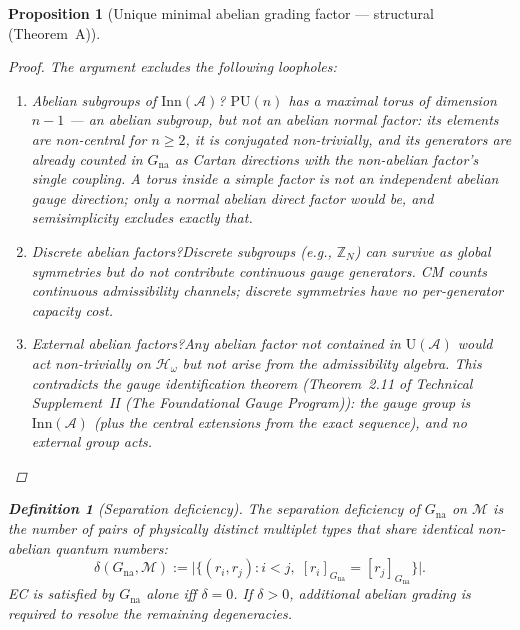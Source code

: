 \documentclass[11pt]{article}
\newtheorem{proposition}[theorem]{Proposition}
\theoremstyle{definition}
\newtheorem{definition}[theorem]{Definition}
\newcommand{\TSII}{Technical Supplement~II (\emph{The Foundational Gauge Program})}
\begin{document}
\begin{proposition}[Unique minimal abelian grading factor ---
structural (Theorem~A)]
\begin{proof}
The argument excludes the following loopholes:
\begin{enumerate}[label=(\alph*),nosep]
  \item \textit{Abelian subgroups of $\mathrm{Inn}(\mathcal{A})$?}\quad
  $\mathrm{PU}(n)$ has a maximal torus of dimension $n - 1$ --- an
  abelian subgroup, but not an abelian \emph{normal factor}: its
  elements are non-central for $n \ge 2$, it is conjugated
  non-trivially, and its generators are already counted in
  $G_{\mathrm{na}}$ as Cartan directions with the non-abelian factor's
  single coupling.  A torus inside a simple factor is not an
  independent abelian gauge direction; only a normal abelian direct
  factor would be, and semisimplicity excludes exactly that.
  \item \textit{Discrete abelian factors?}\quad Discrete subgroups
  (e.g., $\mathbb{Z}_N$) can survive as global symmetries but do not
  contribute continuous gauge generators.  CM counts continuous
  admissibility channels; discrete symmetries have no per-generator
  capacity cost.
  \item \textit{External abelian factors?}\quad Any abelian factor not
  contained in $\mathrm{U}(\mathcal{A})$ would act non-trivially on
  $\mathcal{H}_\omega$ but not arise from the admissibility algebra.
  This contradicts the gauge identification theorem
  (Theorem~2.11 of \TSII{}): the gauge group is
  $\mathrm{Inn}(\mathcal{A})$ (plus the central extensions from the
  exact sequence), and no external group acts.
\end{enumerate}
\end{proof}

\begin{definition}[Separation deficiency]\label{def:sep_deficiency}
The \emph{separation deficiency} of $G_{\mathrm{na}}$ on $\mathcal{M}$
is the number of pairs of physically distinct multiplet types that
share identical non-abelian quantum numbers:
\[
  \delta(G_{\mathrm{na}}, \mathcal{M}) := \bigl|\{(r_i, r_j) : i < j,\;
  [r_i]_{G_{\mathrm{na}}} = [r_j]_{G_{\mathrm{na}}}\}\bigr|.
\]
EC is satisfied by $G_{\mathrm{na}}$ alone iff $\delta = 0$.  If
$\delta > 0$, additional abelian grading is required to resolve the
remaining degeneracies.
\end{definition}


\end{proposition}
\end{document}
